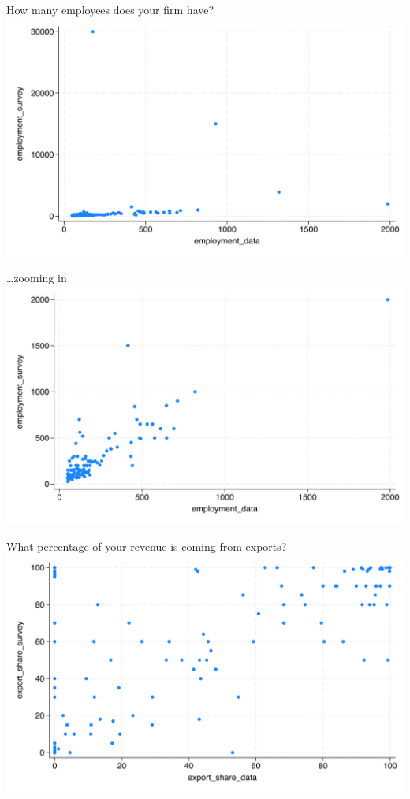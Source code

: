 \documentclass[
  ignorenonframetext,
  aspectratio=1610,
]{beamer}
\begin{document}
\begin{frame}{How many employees does your firm have?}
\protect\hypertarget{how-many-employees-does-your-firm-have}{}
\includegraphics{fig/employment_validation.png}
\end{frame}

\begin{frame}{\ldots zooming in}
\protect\hypertarget{zooming-in}{}
\includegraphics{fig/employment_validation_cleaned.png}
\end{frame}

\begin{frame}{What percentage of your revenue is coming from exports?}
\protect\hypertarget{what-percentage-of-your-revenue-is-coming-from-exports}{}
\includegraphics{fig/export_share_validation.png}
\end{frame}
\end{document}
